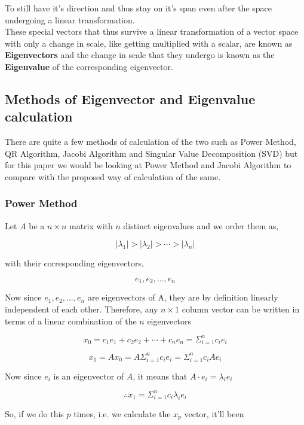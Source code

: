 \documentclass{article}
\begin{document}
To still have it's direction and thus stay on it's span even after the space undergoing a linear transformation.
\\

These special vectors that thus survive a linear transformation of a vector space with only a change in scale, like getting multiplied with a scalar, are known as \large \textbf{Eigenvectors} \normalsize and the change in scale that they undergo is known as the \large \textbf{Eigenvalue} \normalsize of the corresponding eigenvector.

\subsection{Methods of Eigenvector and Eigenvalue calculation}

There are quite a few methods of calculation of the two such as Power Method, QR Algorithm, Jacobi Algorithm and Singular Value Decomposition (SVD) but for this paper we would be looking at Power Method and Jacobi Algorithm to compare with the proposed way of calculation of the same.

\subsubsection{Power Method}

Let $A$ be a $n \times n$ matrix with $n$ distinct eigenvalues and we order them as,

\[
    |\lambda_{1}| > |\lambda_{2}| > \cdots > |\lambda_{n}| 
\]

with their corresponding eigenvectors,

\[
    e_{1}, e_{2}, \dots, e_{n}
\]  

Now since $e_{1}, e_{2}, \dots, e_{n}$ are eigenvectors of A, they are by definition linearly independent of each other. Therefore, any $n \times 1$ column vector can be written in terms of a linear combination of the $n$ eigenvectors 

\[
    x_{0} = c_{1}e_{1} + c_{2}e_{2} + \cdots + c_{n}e_{n} 
          = \Sigma_{i = 1}^{n} c_{i}e_{i}
\]

\[
    x_{1} = Ax_{0} = A\Sigma_{i = 1}^{n} c_{i}e_{i} = \Sigma_{i = 1}^{n} c_{i}Ae_{i}
\]

Now since $e_{i}$ is an eigenvector of $A$, it means that $A \cdot e_{i} = \lambda_{i}e_{i}$

\[
    \therefore x_{1} = \Sigma_{i = 1}^{n} c_{i}\lambda_{i}e_{i}
\]

So, if we do this $p$ times, i.e. we calculate the $x_{p}$ vector, it'll been
\end{document}
